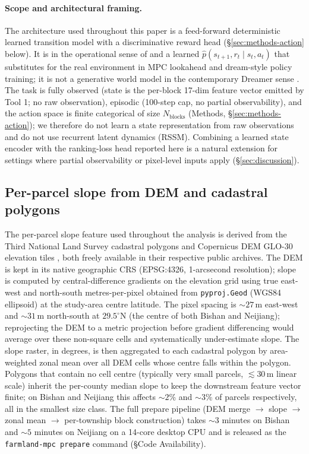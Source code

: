 \documentclass[11pt]{article}
\begin{document}
\paragraph{Scope and architectural framing.} The architecture used throughout this paper is a feed-forward deterministic learned transition model with a discriminative reward head (\S\ref{sec:methods-action} below). It is in the operational sense of \citet{chua2018deep} and \citet{janner2019trust} a learned $\hat{p}(s_{t+1}, r_t \mid s_t, a_t)$ that substitutes for the real environment in MPC lookahead and dream-style policy training; it is not a generative world model in the contemporary Dreamer sense \citep{hafner2025dreamerv3,ha2018world}. The task is fully observed (state is the per-block 17-dim feature vector emitted by Tool 1; no raw observation), episodic (100-step cap, no partial observability), and the action space is finite categorical of size $N_{\text{blocks}}$ (Methods, \S\ref{sec:methods-action}); we therefore do not learn a state representation from raw observations and do not use recurrent latent dynamics (RSSM). Combining a learned state encoder with the ranking-loss head reported here is a natural extension for settings where partial observability or pixel-level inputs apply (\S\ref{sec:discussion}).

\subsection*{Per-parcel slope from DEM and cadastral polygons}\label{sec:methods-prepare}

The per-parcel slope feature used throughout the analysis is derived from the Third National Land Survey cadastral polygons and Copernicus DEM GLO-30 elevation tiles \citep{copernicus2021dem}, both freely available in their respective public archives. The DEM is kept in its native geographic CRS (EPSG:4326, 1-arcsecond resolution); slope is computed by central-difference gradients on the elevation grid using true east-west and north-south metres-per-pixel obtained from \texttt{pyproj.Geod} (WGS84 ellipsoid) at the study-area centre latitude. The pixel spacing is $\sim$$27$\,m east-west and $\sim$$31$\,m north-south at $29.5^\circ$N (the centre of both Bishan and Neijiang); reprojecting the DEM to a metric projection before gradient differencing would average over these non-square cells and systematically under-estimate slope. The slope raster, in degrees, is then aggregated to each cadastral polygon by area-weighted zonal mean over all DEM cells whose centre falls within the polygon. Polygons that contain no cell centre (typically very small parcels, $\lesssim 30$\,m linear scale) inherit the per-county median slope to keep the downstream feature vector finite; on Bishan and Neijiang this affects $\sim$$2$\% and $\sim$$3$\% of parcels respectively, all in the smallest size class. The full prepare pipeline (DEM merge $\to$ slope $\to$ zonal mean $\to$ per-township block construction) takes $\sim$$3$ minutes on Bishan and $\sim$$5$ minutes on Neijiang on a 14-core desktop CPU and is released as the \texttt{farmland-mpc prepare} command (\S Code Availability).
\end{document}
